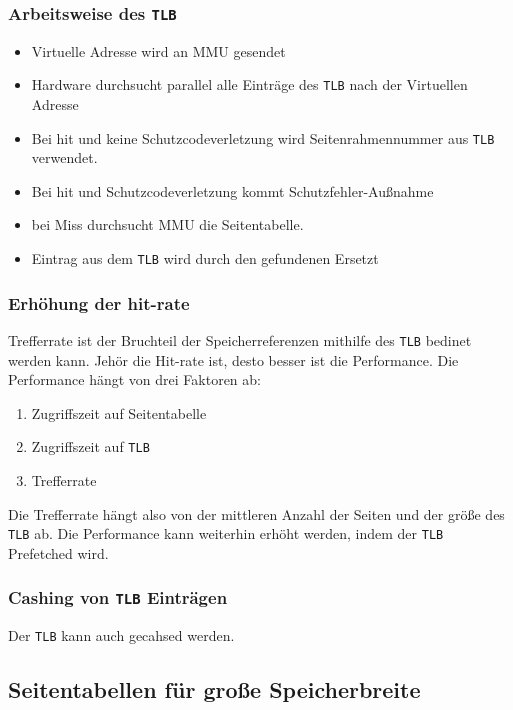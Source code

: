 \subsubsection{Arbeitsweise des \texttt{TLB}}

\begin{itemize}
    \item Virtuelle Adresse wird an MMU gesendet
    \item Hardware durchsucht parallel alle Einträge des \texttt{TLB} nach der Virtuellen Adresse
    \item Bei hit und keine Schutzcodeverletzung wird Seitenrahmennummer aus \texttt{TLB} verwendet.
    \item Bei hit und Schutzcodeverletzung kommt Schutzfehler-Außnahme
    \item bei Miss durchsucht MMU die Seitentabelle.
    \item Eintrag aus dem \texttt{TLB} wird durch den gefundenen Ersetzt
\end{itemize}

\subsubsection{Erhöhung der hit-rate}

Trefferrate ist der Bruchteil der Speicherreferenzen mithilfe des \texttt{TLB} bedinet werden kann. Jehör die Hit-rate ist, desto besser ist die Performance. Die Performance hängt von drei Faktoren ab:

\begin{enumerate}
    \item Zugriffszeit auf Seitentabelle
    \item Zugriffszeit auf \texttt{TLB}
    \item Trefferrate
\end{enumerate}

Die Trefferrate hängt also von der mittleren Anzahl der Seiten und der größe des \texttt{TLB} ab. Die Performance kann weiterhin erhöht werden, indem der \texttt{TLB} Prefetched wird.

\subsubsection*{Cashing von \texttt{TLB} Einträgen}

Der \texttt{TLB} kann auch gecahsed werden.

\subsection{Seitentabellen für große Speicherbreite}

